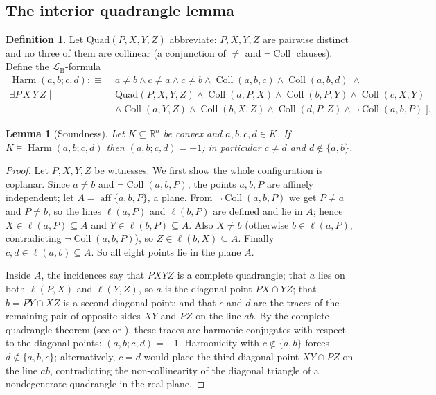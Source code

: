 \documentclass[11pt]{amsart}
\newtheorem{lemma}[theorem]{Lemma}
\theoremstyle{definition}
\newtheorem{definition}[theorem]{Definition}
\newcommand{\R}{\mathbb{R}}
\newcommand{\LB}{\mathcal{L}_{\mathrm{B}}}
\newcommand{\Coll}{\operatorname{Coll}}
\newcommand{\Harm}{\operatorname{Harm}}
\newcommand{\aff}{\operatorname{aff}}
\begin{document}
\subsection{The interior quadrangle lemma}

\begin{definition}\label{def:harmformula}
Let $\mathrm{Quad}(P,X,Y,Z)$ abbreviate: $P,X,Y,Z$ are pairwise distinct and
no three of them are collinear (a conjunction of $\ne$ and
$\neg\Coll$ clauses). Define the $\LB$-formula
\begin{align*}
\Harm(a,b;c,d):\equiv\;& a\ne b\wedge c\ne a\wedge c\ne b
\wedge\Coll(a,b,c)\wedge\Coll(a,b,d)\;\wedge\\
\exists P\,X\,Y\,Z\;\bigl[\;&\mathrm{Quad}(P,X,Y,Z)
\wedge\Coll(a,P,X)\wedge\Coll(b,P,Y)\wedge\Coll(c,X,Y)\\
&\wedge\Coll(a,Y,Z)\wedge\Coll(b,X,Z)\wedge\Coll(d,P,Z)
\wedge\neg\Coll(a,b,P)\;\bigr].
\end{align*}
\end{definition}

\begin{lemma}[Soundness]\label{lem:harm-sound}
Let $K\subseteq\R^n$ be convex and $a,b,c,d\in K$. If
$K\models\Harm(a,b;c,d)$ then $(a,b;c,d)=-1$; in particular $c\ne d$ and
$d\notin\{a,b\}$.
\end{lemma}

\begin{proof}
Let $P,X,Y,Z$ be witnesses. We first show the whole configuration is
coplanar. Since $a\ne b$ and $\neg\Coll(a,b,P)$, the points $a,b,P$ are
affinely independent; let $A=\aff\{a,b,P\}$, a plane. From
$\neg\Coll(a,b,P)$ we get $P\ne a$ and $P\ne b$, so the lines
$\ell(a,P)$ and $\ell(b,P)$ are defined and lie in $A$; hence
$X\in\ell(a,P)\subseteq A$ and $Y\in\ell(b,P)\subseteq A$. Also $X\ne b$
(otherwise $b\in\ell(a,P)$, contradicting $\neg\Coll(a,b,P)$), so
$Z\in\ell(b,X)\subseteq A$. Finally $c,d\in\ell(a,b)\subseteq A$. So all
eight points lie in the plane $A$.

Inside $A$, the incidences say that $PXYZ$ is a complete quadrangle; that
$a$ lies on both $\ell(P,X)$ and $\ell(Y,Z)$, so $a$ is the diagonal point
$PX\cap YZ$; that $b=PY\cap XZ$ is a second diagonal point; and that $c$ and
$d$ are the traces of the remaining pair of opposite sides $XY$ and $PZ$ on
the line $ab$. By the complete-quadrangle theorem (see
\cite[Ch.~2]{Coxeter49} or \cite[\S5]{Hartshorne67}), these traces are
harmonic conjugates with respect to the diagonal points: $(a,b;c,d)=-1$.
Harmonicity with $c\notin\{a,b\}$ forces $d\notin\{a,b,c\}$; alternatively,
$c=d$ would place the third diagonal point $XY\cap PZ$ on the line $ab$,
contradicting the non-collinearity of the diagonal triangle of a
nondegenerate quadrangle in the real plane.
\end{proof}
\end{document}
